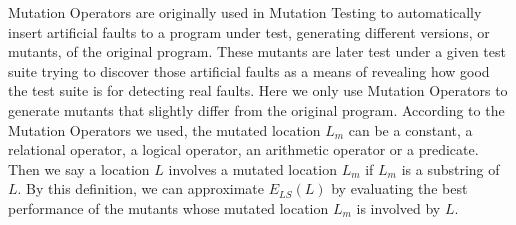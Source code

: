 Mutation Operators are originally used in Mutation Testing to automatically insert artificial faults to a program under test, generating different versions, or mutants, of the original program. These mutants are later test under a given test suite trying to discover those artificial faults as a means of revealing how good the test suite is for detecting real faults. Here we only use Mutation Operators to generate mutants that slightly differ from the original program. According to the Mutation Operators we used, the mutated location $L_m$ can be a constant, a relational operator, a logical operator, an arithmetic operator or a predicate. Then we say a location $L$ involves a mutated location $L_m$ if $L_m$ is a substring of $L$. By this definition, we can approximate $E_{LS}(L)$ by evaluating the best performance of the mutants whose mutated location $L_m$ is involved by $L$. 
